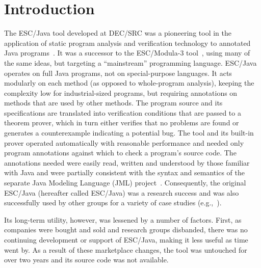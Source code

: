 \documentclass{llncs}
\begin{document}



\section{Introduction}

The ESC/Java tool developed at DEC/SRC was a pioneering tool in the
application of static program analysis and verification technology to
annotated Java programs~\cite{Flanagan-etal02}.  It was a successor to
the ESC/Modula-3 tool~\cite{ESCModula3}, using many of the same
ideas, but targeting a ``mainstream'' programming language.  ESC/Java 
operates on full Java programs, not on special-purpose languages.  It acts
modularly on each method (as opposed to whole-program analysis), 
keeping the complexity low for industrial-sized programs, but requiring 
annotations on methods that are used by other methods.  The program source
and its specifications are translated into verification conditions that are passed
to a theorem prover, which in turn either verifies that no problems are found or
generates a counterexample indicating a potential bug. The tool
and its built-in prover operated automatically with reasonable
performance and needed only program annotations against which to check
a program's source code.  The annotations needed were easily read,
written and understood by those familiar with Java and were partially
consistent with the syntax and semantics of the separate Java Modeling
Language (JML) project~\cite{jmlpapers,Leavens-etal00}.  Consequently,
the original ESC/Java (hereafter called ESC/Java) was a research
success and was also successfully used by other groups for a variety
of case studies (e.g.,~\cite{Hub03,HOP04}).


Its long-term utility, however, was lessened by a number of factors.
First, as companies were bought and sold and research groups
disbanded, there was no continuing development or support of ESC/Java,
making it less useful as time went by.  As a result of these
marketplace changes, the tool was untouched for over two years and its
source code was not available.
\end{document}
